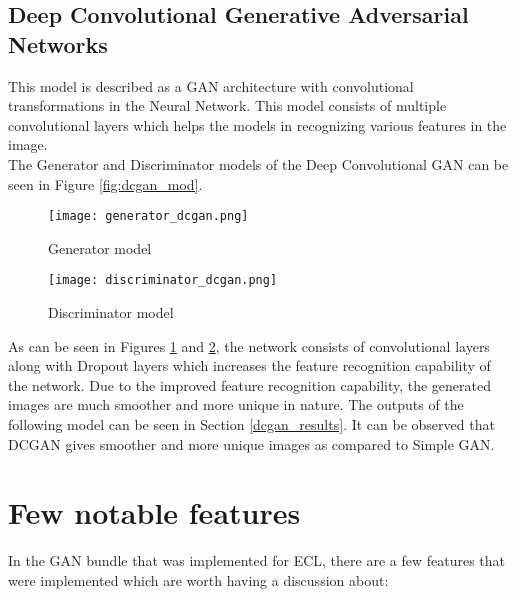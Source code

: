 \documentclass[conference]{IEEEtran}
\begin{document}
\subsection{Deep Convolutional Generative Adversarial Networks}\label{dcgan}

This model is described as a GAN architecture with convolutional transformations in the Neural Network. This model consists of multiple convolutional layers which helps the models in recognizing various features in the image. 
\\
The Generator and Discriminator models of the Deep Convolutional GAN can be seen in Figure \ref{fig:dcgan_mod}.

\begin{figure*}
     \centering
     \begin{subfigure}[b]{\columnwidth}
         \centering
         \texttt{[image: generator\_dcgan.png]}
         \caption{Generator model}
         \label{fig:gen_dcgan}
     \end{subfigure}
     \hfill
     \begin{subfigure}[b]{\columnwidth}
         \centering
         \texttt{[image: discriminator\_dcgan.png]}
         \caption{Discriminator model}
         \label{fig:dis_dcgan}
     \end{subfigure}
        \caption{Deep Convolutional Generative Adversarial Networks}
        \label{fig:dcgan_mod}
\end{figure*}

As can be seen in Figures \ref{fig:gen_dcgan} and \ref{fig:dis_dcgan}, the network consists of convolutional layers along with Dropout layers which increases the feature recognition capability of the network. Due to the improved feature recognition capability, the generated images are much smoother and more unique in nature. The outputs of the following model can be seen in Section \ref{dcgan_results}. It can be observed that DCGAN gives smoother and more unique images as compared to Simple GAN. 

\section{Few notable features}

In the GAN bundle that was implemented for ECL\cite{ganbund}, there are a few features that were implemented which are worth having a discussion about:
\end{document}
